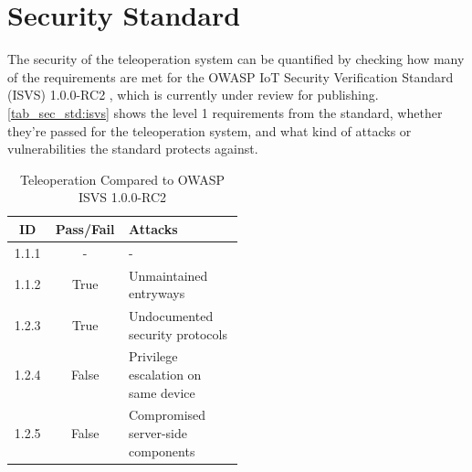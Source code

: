 \chapter{Security Standard}\label{ch:sec_std}

The security of the teleoperation system can be quantified by checking how many of the requirements are met for the OWASP IoT Security Verification Standard (ISVS) 1.0.0-RC2 \cite{bib:OWASP_ISVS}, which is currently under review for publishing. \autoref{tab_sec_std:isvs} shows the level 1 requirements from the standard, whether they're passed for the teleoperation system, and what kind of attacks or vulnerabilities the standard protects against.

\begin{table}[h!]
\centering
\caption{Teleoperation Compared to OWASP ISVS 1.0.0-RC2}
\label{tab_sec_std:isvs}
\small{
\begin{tabular}{|c|c|p{0.5\linewidth}|}
    \hline
    \textbf{ID} & \textbf{Pass/Fail} & \textbf{Attacks} \\
    \hline \hline
    1.1.1 & - & - \\
    1.1.2 & True & Unmaintained entryways \\
    1.2.3 & True & Undocumented security protocols \\
    1.2.4 & False & Privilege escalation on same device \\
    1.2.5 & False & Compromised server-side components \\
    
\end{tabular}
}
\end{table}
